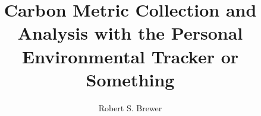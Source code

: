 \documentclass[11pt,draft,times,dissertation,proposal]{uhthesis2e}
\begin{document}
\title{Carbon Metric Collection and Analysis with the Personal Environmental
Tracker or Something}
\author{Robert S. Brewer}

\maketitle

\begin{frontmatter}

\signaturepage


%

%



\tableofcontents

\listoftables

\listoffigures

\end{frontmatter}
\end{document}
